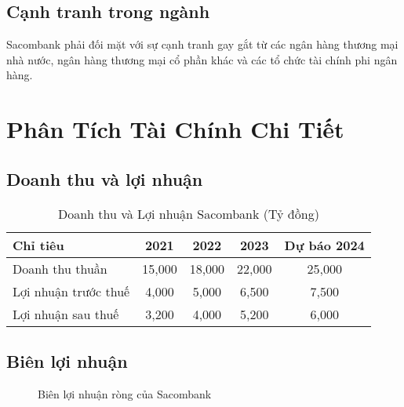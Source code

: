 \documentclass[11pt]{article}
\begin{document}
\subsection{Cạnh tranh trong ngành}
Sacombank phải đối mặt với sự cạnh tranh gay gắt từ các ngân hàng thương mại nhà nước, ngân hàng thương mại cổ phần khác và các tổ chức tài chính phi ngân hàng.

\section{Phân Tích Tài Chính Chi Tiết}

\subsection{Doanh thu và lợi nhuận}

\begin{table}[h!]
\centering
\caption{Doanh thu và Lợi nhuận Sacombank (Tỷ đồng)}
\begin{tabular}{lcccc}
\toprule
Chỉ tiêu & 2021 & 2022 & 2023 & Dự báo 2024 \\
\midrule
Doanh thu thuần & 15,000 & 18,000 & 22,000 & 25,000 \\
Lợi nhuận trước thuế & 4,000 & 5,000 & 6,500 & 7,500 \\
Lợi nhuận sau thuế & 3,200 & 4,000 & 5,200 & 6,000 \\
\bottomrule
\end{tabular}
\end{table}

\subsection{Biên lợi nhuận}

\begin{figure}[h!]
\centering
{}
\caption{Biên lợi nhuận ròng của Sacombank}
\end{figure}
\end{document}
